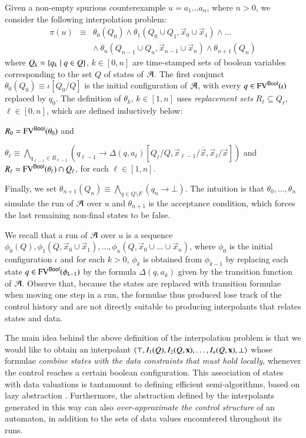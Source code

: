 \documentclass[10pt,conference,letterpaper,twocolumn]{IEEEtran}
\begin{document}
Given a non-empty spurious counterexample $u = a_1\ldots a_n$, where
$n>0$, we consider the following interpolation problem: 
\begin{eqnarray}\label{eq:interpolation-problem}
\pi(u) & \equiv & \theta_0(Q_0) \wedge \theta_1(Q_0 \cup Q_1,\vec{x}_0
\cup \vec{x}_1) \wedge \ldots \\ 
&& \wedge~ \theta_n(Q_{n-1} \cup Q_n,\vec{x}_{n-1} \cup \vec{x}_n) \wedge \theta_{n+1}(Q_n) \nonumber
\end{eqnarray}
where $Q_k = \left\{ q_k \mid q \in Q \right\}$, $k \in [0,n]$ are time-stamped
sets of boolean variables corresponding to the set $Q$ of states of
$\mathcal{A}$. The first conjunct $\theta_0(Q_0) \equiv \iota[Q_0/Q]$ is the
initial configuration of $\mathcal{A}$, with every $q \in \mathrm{FV}^{\mathsf{Bool}}(\iota)$
replaced by $q_0$. The definition of $\theta_k$, $k\in[1,n]$ uses
\emph{replacement sets} $R_\ell \subseteq Q_\ell$, $\ell\in [0,n]$,
which are defined inductively below: \begin{compactitem}
\item $R_0 = \mathrm{FV}^{\mathsf{Bool}}(\theta_0)$ and 
%
\item $\theta_\ell \equiv \bigwedge_{q_{\ell-1}\in R_{\ell-1}}
  (q_{\ell-1} \rightarrow
  \Delta(q,a_\ell)[Q_\ell/Q,\vec{x}_{\ell-1}/\overline{\vec{x}},\vec{x}_\ell/\vec{x}])$
  and $R_\ell = \mathrm{FV}^{\mathsf{Bool}}(\theta_\ell) \cap Q_\ell$, for each
  $\ell\in[1,n]$.
\end{compactitem}
Finally, we set $\theta_{n+1}(Q_n) \equiv \bigwedge_{q \in Q \setminus
  F} (q_n \rightarrow \bot)$. The intuition is that $\theta_0, \ldots,
\theta_n$ simulate the run of $\mathcal{A}$ over $u$ and $\theta_{n+1}$ is the
acceptance condition, which forces the last remaining non-final states
to be false. 

We recall that a run of $\mathcal{A}$ over $u$ is a sequence $\phi_0(Q),
\phi_1(Q,\vec{x}_0\cup\vec{x}_1), \ldots,
\phi_n(Q,\vec{x}_0\cup\ldots\cup\vec{x}_n)$, where $\phi_0$ is the
initial configuration $\iota$ and for each $k>0$, $\phi_k$ is obtained
from $\phi_{k-1}$ by replacing each state $q \in
\mathrm{FV}^{\mathsf{Bool}}(\phi_{k-1})$ by the formula $\Delta(q,a_k)$ given by the
transition function of $\mathcal{A}$. Observe that, because the states are
replaced with transition formulae when moving one step in a run, the
formulae thus produced lose track of the control history and are not
directly suitable to producing interpolants that relates states and
data.

The main idea behind the above definition of the interpolation problem
is that we would like to obtain an interpolant $\left\langle \top,I_1(Q),
  I_2(Q,\mathbf x), \ldots, I_{n}(Q,\mathbf x),\bot \right\rangle$ whose formulae
\emph{combine states with the data constraints that must hold
  locally}, whenever the control reaches a certain boolean
configuration. This association of states with data valuations is
tantamount to defining efficient semi-algorithms, based on lazy
abstraction \cite{HJMS02}. Furthermore, the abstraction defined by the
interpolants generated in this way can also \emph{over-approximate the
  control structure} of an automaton, in addition to the sets of data
values encountered throughout its runs.
\end{document}
